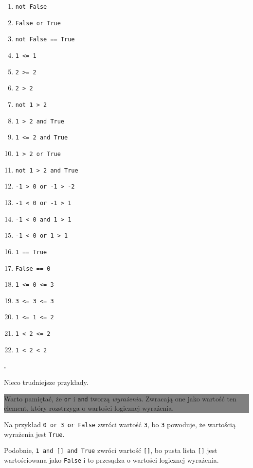 \documentclass[a4paper]{article}
\newcommand{\important}[1]{
    \begin{center}\colorbox{gray}{
        \begin{minipage}[t]{0.9\textwidth}{#1}
        \end{minipage}
    }
    \end{center}
}
\begin{document}
\begin{multicols}{2}
\begin{enumerate}[label=\arabic*.]
    \item \verb|not False|
    \item \verb|False or True|
    \item \verb|not False == True|
    \item \verb|1 <= 1|
    \item \verb|2 >= 2|
    \item \verb|2 > 2|
    \item \verb|not 1 > 2|
    \item \verb|1 > 2 and True|
    \item \verb|1 <= 2 and True|
    \item \verb|1 > 2 or True|
    \item \verb|not 1 > 2 and True|
    \item \verb|-1 > 0 or -1 > -2|
    \item \verb|-1 < 0 or -1 > 1|
    \item \verb|-1 < 0 and 1 > 1|
    \item \verb|-1 < 0 or 1 > 1|
    \item \verb|1 == True|
    \item \verb|False == 0|
    \item \verb|1 <= 0 <= 3|
    \item \verb|3 <= 3 <= 3|
    \item \verb|1 <= 1 <= 2|
    \item \verb|1 < 2 <= 2|
    \item \verb|1 < 2 < 2|

\end{enumerate}
\end{multicols}


\textbf{.}\addtocounter{zadanie}{1} Nieco trudniejsze przykłady.

\important{Warto pamiętać, że \texttt{or} i \texttt{and} tworzą \emph{wyrażenia}. Zwracają one jako wartość ten element, który rozstrzyga o wartości logicznej wyrażenia.}

Na przykład \verb|0 or 3 or False| zwróci wartość \verb|3|, bo \verb|3| powoduje, że wartością wyrażenia jest \verb|True|.

Podobnie, \verb|1 and [] and True| zwróci wartość \verb|[]|, bo pusta lista \verb|[]| jest wartościowana jako \verb|False| i to przesądza o wartości logicznej wyrażenia.
\end{document}
